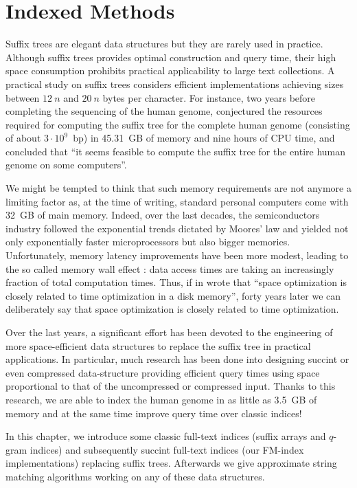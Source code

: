 \chapter{Indexed Methods}
\label{chr:index}

Suffix trees are elegant data structures but they are rarely used in practice.
Although suffix trees provides optimal construction and query time, their high space consumption prohibits practical applicability to large text collections.
A practical study on suffix trees \citep{Kurtz1999} considers efficient implementations achieving sizes between $12~n$ and $20~n$ bytes per character.
For instance, two years before completing the sequencing of the human genome, \citeauthor{Kurtz1999} conjectured the resources required for computing the suffix tree for the complete human genome (consisting of about $3 \cdot 10^9$~bp) in 45.31~GB of memory and nine hours of CPU time, and concluded that ``it seems feasible to compute the suffix tree for the entire human genome on some computers''.

We might be tempted to think that such memory requirements are not anymore a limiting factor as, at the time of writing, standard personal computers come with 32~GB of main memory.
Indeed, over the last decades, the semiconductors industry followed the exponential trends dictated by Moores' law and yielded not only exponentially faster microprocessors but also bigger memories.
Unfortunately, memory latency improvements have been more modest, leading to the so called memory wall effect \citep{?}: data access times are taking an increasingly fraction of total computation times.
Thus, if in \citeyear{Knuth1973} \citeauthor{Knuth1973} wrote that ``space optimization is closely related to time optimization in a disk memory'', forty years later we can deliberately say that space optimization is closely related to time optimization.

Over the last years, a significant effort has been devoted to the engineering of more space-efficient data structures to replace the suffix tree in practical applications.
In particular, much research has been done into designing succint or even compressed data-structure providing efficient query times using space proportional to that of the uncompressed or compressed input.
Thanks to this research, we are able to index the human genome in as little as 3.5~GB of memory and at the same time improve query time over classic indices!

In this chapter, we introduce some classic full-text indices (suffix arrays and $q$-gram indices) and subsequently succint full-text indices (our FM-index implementations) replacing suffix trees.
Afterwards we give approximate string matching algorithms working on any of these data structures.

